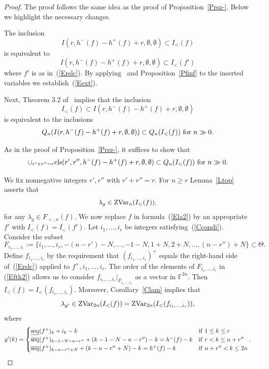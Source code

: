 \documentclass[10pt]{amsart}\oddsidemargin -1mm \evensidemargin -1mm \topmargin -15mm\headheight5mm \headsep 3.5mm \textheight 245mm\textwidth 170mm
\theoremstyle{definition}\newtheorem{theorem}{Theorem}[section]\newtheorem{lemma}[theorem]{Lemma}\newtheorem{remark}[theorem]{Remark}\newtheorem{proposition}[theorem]{Proposition}\newtheorem{corollary}[theorem]{Corollary}\newtheorem{definition}[theorem]{Definition}\newtheorem{Ex}[theorem]{Example}\newtheorem{obs}[theorem]{Observation}\newtheorem{nota}[theorem]{Notation}
\begin{document}
\begin{proof} The proof follows the same idea as the proof of Proposition~\ref{Prsz-}. 
Below we highlight the necessary changes.  

The inclusion 
$$I(r, h^-(f)-h^+(f)+r, \emptyset, \emptyset)\subset I_<(f)$$
is equivalent to
\begin{equation}I(r, h^-(f)-h^+(f)+r, \emptyset, \emptyset)\subset I_<(f')\label{Eext}\end{equation}
where $f'$ is as in~(\ref{Erslc}). 
By applying~\cite[Lemma~5.4]{PP2} and Proposition~\ref{Pfinf} to the inserted variables we establish~(\ref{Eext}).

Next,  Theorem 3.2 of~\cite{PP2} implies that the inclusion
$$I_<(f)\subset I(r, h^-(f)-h^+(f)+r, \emptyset, \emptyset)$$
is equivalent to the inclusions
$$Q_n(I(r, h^-(f)-h^+(f)+r, \emptyset, \emptyset))\subset Q_n(I_<(f)){\rm~for~}n\gg0.$$

As in the proof of Proposition~\ref{Prsz-}, it suffices to show that
$$\cup_{r'+r''=r}{\rm cls}(r', r'', h^-(f)-h^+(f)+r, \emptyset, \emptyset)\subset Q_n(I_<(f)){\rm~for~}n\gg0.$$

We fix nonnegative integers $r', r''$ with $r'+r''=r$. 
For $n\ge r$ Lemma~\ref{Ltop} asserts that
\begin{equation}\lambda_{g}\in {\rm ZVar}_n(I_<(f)),\label{Ela2}\end{equation}
for any $\lambda_g\in F_{<, n}(f)$. 
We now replace $f$ in formula~(\ref{Ela2}) by an appropriate $f'$ with $I_<(f)=I_<(f')$.
Let $i_1,..., i_r$ be integers satisfying~(\ref{Ccondi}). 
Consider the subset \begin{equation}F_{i_1,..., i_r}:=\{i_1,..., i_r,-(n-r')-N,..., -1-N, 1+N, 2+N,..., (n-r'')+N\}\subset \Theta.\label{Efth2}\end{equation} 
Define $f_{i_1,..., i_r}$ by the requirement that $(f_{i_1,..., i_r})^+$ equals the right-hand side of~(\ref{Erslc}) applied to $f^+, i_1,..., i_r$. 
The order of the elements of $F_{i_1,..., i_r}$ in (\ref{Efth2}) allows us to consider $f_{i_1,..., i_r}|_{F_{i_1,..., i_r}}$ as a vector in $\mathbb F^{2n}$. 
Then $I_<(f)=I_<(f_{i_1,..., i_r})$. 
Moreover, Corollary~\ref{Clam} implies that
$$\lambda_{g'}\in {\rm ZVar}_{2n}(I_<(f))={\rm ZVar}_{2n}(I_<(f_{i_1,..., i_r})),$$where
$$g'(k)=\begin{cases}{\rm\underline{seq}}(f^+)_k+i_k-k&{\rm if~}1\le k\le r\\
{\rm\overline{seq}}(f^+)_{k-1-N-n-r''}+(k-1-N-n-r'')-k=h^-(f)-k&{\rm if~}r<k\le n+r''\\
{\rm\overline{seq}}(f^+)_{k-n-r''+N}+(k-n-r''+N)-k=h^+(f)-k&{\rm if~}n+r''<k\le 2n\\
\end{cases}.$$


\end{proof}
\end{document}
